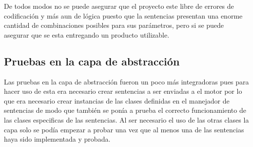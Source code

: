 De todos modos no se puede asegurar que el proyecto este libre de errores de codificación y más aun de lógica puesto que la sentencias presentan una enorme cantidad de combinaciones posibles para sus parámetros, pero si se puede asegurar que se esta entregando un producto utilizable.
%
\subsection{Pruebas en la capa de abstracción}
Las pruebas en la capa de abstracción fueron un poco más integradoras pues para hacer uso de esta era necesario crear sentencias a ser enviadas a el motor por lo que era necesario crear instancias de las clases definidas en el manejador de sentencias de modo que también se ponía a prueba el correcto funcionamiento de las clases especificas de las sentencias. Al ser necesario el uso de las otras clases la capa solo se podía empezar a probar una vez que al menos una de las sentencias haya sido implementada y probada.